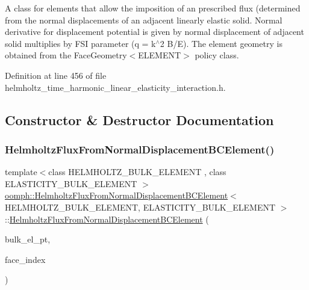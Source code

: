 A class for elements that allow the imposition of an prescribed flux (determined from the normal displacements of an adjacent linearly elastic solid. Normal derivative for displacement potential is given by normal displacement of adjacent solid multiplies by F\+SI parameter (q = k$^\wedge$2 B/E). The element geometry is obtained from the Face\+Geometry$<$\+E\+L\+E\+M\+E\+N\+T$>$ policy class. 

Definition at line 456 of file helmholtz\+\_\+time\+\_\+harmonic\+\_\+linear\+\_\+elasticity\+\_\+interaction.\+h.



\subsection{Constructor \& Destructor Documentation}
\mbox{\label{classoomph_1_1HelmholtzFluxFromNormalDisplacementBCElement_ae37a7a8b5ad9850527f9285f2325aa2c}} 
\subsubsection{\texorpdfstring{Helmholtz\+Flux\+From\+Normal\+Displacement\+B\+C\+Element()}{HelmholtzFluxFromNormalDisplacementBCElement()}\hspace{0.1cm}{\footnotesize\ttfamily [1/2]}}
{\footnotesize\ttfamily template$<$class H\+E\+L\+M\+H\+O\+L\+T\+Z\+\_\+\+B\+U\+L\+K\+\_\+\+E\+L\+E\+M\+E\+NT , class E\+L\+A\+S\+T\+I\+C\+I\+T\+Y\+\_\+\+B\+U\+L\+K\+\_\+\+E\+L\+E\+M\+E\+NT $>$ \\
\hyperlink{classoomph_1_1HelmholtzFluxFromNormalDisplacementBCElement}{oomph\+::\+Helmholtz\+Flux\+From\+Normal\+Displacement\+B\+C\+Element}$<$ H\+E\+L\+M\+H\+O\+L\+T\+Z\+\_\+\+B\+U\+L\+K\+\_\+\+E\+L\+E\+M\+E\+NT, E\+L\+A\+S\+T\+I\+C\+I\+T\+Y\+\_\+\+B\+U\+L\+K\+\_\+\+E\+L\+E\+M\+E\+NT $>$\+::\hyperlink{classoomph_1_1HelmholtzFluxFromNormalDisplacementBCElement}{Helmholtz\+Flux\+From\+Normal\+Displacement\+B\+C\+Element} (\begin{DoxyParamCaption}\item[{Finite\+Element $\ast$const \&}]{bulk\+\_\+el\+\_\+pt,  }\item[{const int \&}]{face\+\_\+index }\end{DoxyParamCaption})}



